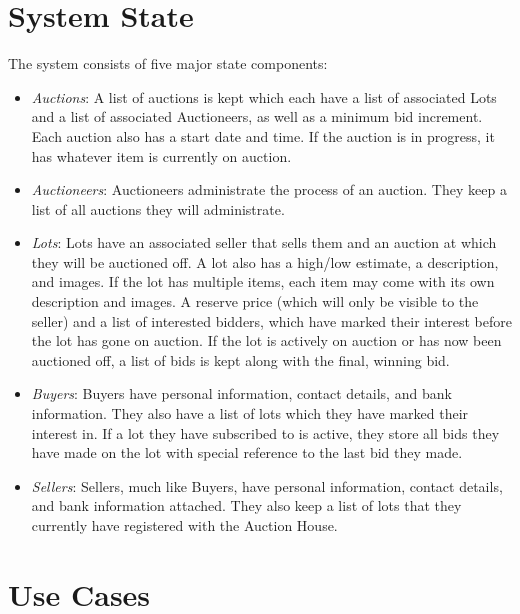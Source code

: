 \documentclass[titlepage, 12pt]{extarticle}
\begin{document}
\section{System State}
The system consists of five major state components:
\begin{itemize}
\item {\it Auctions}: A list of auctions is kept which each have a list of associated Lots and a list of associated Auctioneers, as well as a minimum bid increment. Each auction also has a start date and time. If the auction is in progress, it has whatever item is currently on auction.
\item {\it Auctioneers}: Auctioneers administrate the process of an auction. They keep a list of all auctions they will administrate.
\item {\it Lots}: Lots have an associated seller that sells them and an auction at which they will be auctioned off. A lot also has a high/low estimate, a description, and images. If the lot has multiple items, each item may come with its own description and images. A reserve price (which will only be visible to the seller) and a list of interested bidders, which have marked their interest before the lot has gone on auction. If the lot is actively on auction or has now been auctioned off, a list of bids is kept along with the final, winning bid.
\item {\it Buyers}: Buyers have personal information, contact details, and bank information. They also have a list of lots which they have marked their interest in. If a lot they have subscribed to is active, they store all bids they have made on the lot with special reference to the last bid they made.
\item {\it Sellers}: Sellers, much like Buyers, have personal information, contact details, and bank information attached. They also keep a list of lots that they currently have registered with the Auction House.
\end{itemize}

\section{Use Cases}
\end{document}
